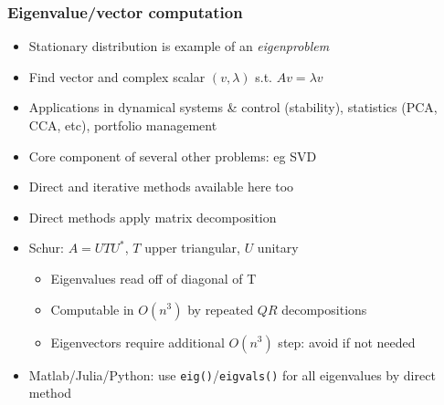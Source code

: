 \documentclass[bigger]{beamer}
\begin{document}
\begin{frame}%
\frametitle{Eigenvalue/vector computation}

\begin{itemize}

\item Stationary distribution is example of an \emph{eigenproblem}
\item Find vector and complex scalar $(v,\lambda)$ s.t. $Av=\lambda v$
\item Applications in dynamical systems \& control (stability), statistics (PCA, CCA, etc), portfolio management
\item Core component of several other problems: eg SVD
\item Direct and iterative methods available here too
\item Direct methods apply matrix decomposition 
\item Schur: $A=UTU^{*}$, $T$ upper triangular, $U$ unitary
\begin{itemize}
\item Eigenvalues read off of diagonal of T
\item Computable in $O(n^3)$ by repeated $QR$ decompositions
\item Eigenvectors require additional $O(n^3)$ step: avoid if not needed
\end{itemize}
\item Matlab/Julia/Python: use \texttt{eig()}/\texttt{eigvals()} for all eigenvalues by direct method



\end{itemize}

\end{frame}%
\end{document}
